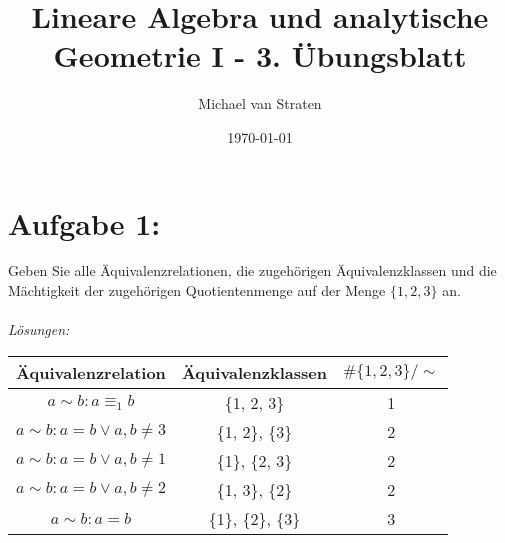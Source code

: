 \documentclass{exam}
\title{Lineare Algebra und analytische Geometrie I - 3. Übungsblatt}
\author{Michael van Straten}
\date{\today}
\begin{document}
\maketitle

\section*{Aufgabe 1:}
Geben Sie alle Äquivalenzrelationen, die zugehörigen Äquivalenzklassen und die Mächtigkeit der
zugehörigen Quotientenmenge auf der Menge $\{1, 2, 3\}$ an. \\
\\
\textit{Lösungen:}
\begin{center}
    \begin{tabular}{ | c | c | c | }
        \hline
        \textbf{Äquivalenzrelation}         & \textbf{Äquivalenzklassen} & $\#\{1,2,3\}/\sim$ \\
        \hline
        $a \sim b: a \equiv_1 b$            & \{1, 2, 3\}                & 1                  \\
        $a \sim b: a = b \lor a,b \not = 3$ & \{1, 2\}, \{3\}            & 2                  \\
        $a \sim b: a = b \lor a,b \not = 1$ & \{1\}, \{2, 3\}            & 2                  \\
        $a \sim b: a = b \lor a,b \not = 2$ & \{1, 3\}, \{2\}            & 2                  \\
        $a \sim b: a = b$                   & \{1\}, \{2\}, \{3\}        & 3                  \\
        \hline
    \end{tabular}
\end{center}

\pagebreak
\end{document}
